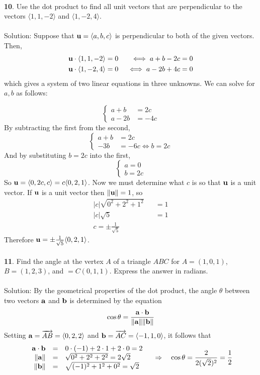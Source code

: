 \documentclass[12pt]{amsbook}
\newcommand{\la}{\langle}
\newcommand{\ra}{\rangle}
\begin{document}
\\
{\small\bf 10}. Use the dot product to find all unit vectors that are perpendicular to 
the vectors $\la 1,1,-2\ra$ and $\la 1,-2,4\ra$.\\
\\
{\sc Solution}:
Suppose that ${\bf u}=\la a,b,c \ra$ is perpendicular to both of the given vectors. Then,
\begin{eqnarray*}
{\bf u}\cdot \la 1,1,-2 \ra =0 \ &&\iff a+b-2c=0 \\
{\bf u}\cdot \la 1,-2,4 \ra =0 \ &&\iff a-2b+4c=0 
\end{eqnarray*} 
which gives a system of two linear equations in three unknowns. We can solve for $a,b$ as follows:

$$ \begin{cases}
 a+b&=2c \\
a-2b&=-4c 
 \end{cases}$$
 By subtracting the first from the second,
 $$\begin{cases}
 a+b&=2c \\
-3b&=-6c \iff b=2c
 \end{cases}$$
 And by substituting $b=2c$ into the first,
 $$\begin{cases}
  a=0 \\
  b=2c
 \end{cases}$$
 So ${\bf u}=\la 0,2c,c \ra = c\la 0,2,1 \ra $. Now we must determine what $c$ is so that $\bf u$ is a unit vector. If $\bf u$ is a unit vector then $\|{\bf u} \|=1$, so
 \begin{eqnarray*}
 |c|\sqrt{0^2+2^2+1^2}&&=1 \\
 |c|\sqrt{5}&&=1\\
 c=\pm \frac {1}{\sqrt{5}}
 \end{eqnarray*}
Therefore ${\bf u}=\pm \frac{1}{\sqrt{5}} \la 0,2,1 \ra$.
\\
\\
{\small\bf 11}. Find the angle at the vertex $A$ of a triangle $ABC$ for
$A=(1,0,1)$, $B=(1,2,3)$, and $=C(0,1,1)$. Express the answer in
radians. \\
\\
{\sc Solution}: By the geometrical 
properties of the dot product, the angle $\theta$ between two 
vectors ${\bf a}$ and ${\bf b}$ is determined 
by the equation 
$$
\cos\theta = \frac{{\bf a}\cdot{\bf b}}{\|{\bf a}\|\|{\bf b}\|}
$$
Setting ${\bf a}=\overrightarrow{AB}=\langle 0, 2,2\rangle$
and ${\bf b}=\overrightarrow{AC}=\langle-1,1,0\rangle$,
it follows that
$$
\begin{array}{rcl}
{\bf a}\cdot{\bf b}&=&0\cdot (-1)+2\cdot 1+2\cdot 0=2\\
\|{\bf a}\|&=&\sqrt{0^2+2^2+2^2}=2\sqrt{2}\\
\|{\bf b}\|&=&\sqrt{(-1)^2+1^2+0^2}=\sqrt{2}
\end{array}
\quad\Rightarrow\quad
\cos\theta=\frac{2}{2(\sqrt{2})^2}=\frac 12
$$
\end{document}
